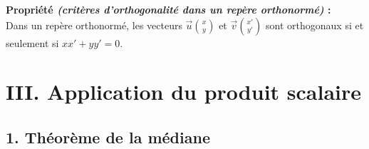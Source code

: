 \documentclass[11pt,a4paper]{article}
\begin{document}
\begin{mdframed}[style=proprieteStyle]
    \textbf{Propriété \emph{(critères d'orthogonalité dans un repère orthonormé)} :} ~\\
    Dans un repère orthonormé, les vecteurs $\displaystyle\vec{u}\binom{x}{y}$ et $\displaystyle\vec{v}\binom{x'}{y'}$ sont orthogonaux si et seulement si $xx'+yy'=0$.
\end{mdframed}

\newpage

\section*{III. Application du produit scalaire}

\subsection*{1. Théorème de la médiane}
\end{document}
